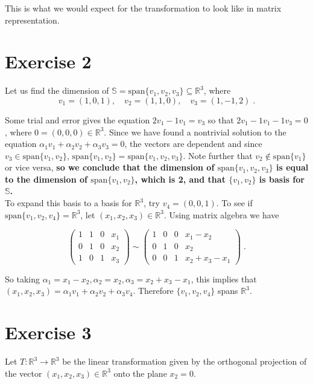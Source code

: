 \documentclass[11pt]{article}
\begin{document}
This is what we would expect for the transformation to look like in matrix representation.

\section*{Exercise 2}

Let us find the dimension of $\mathbb{S} = \text{span} \{v_1, v_2, v_3\} \subseteq \mathbb{R}^3$, where $$v_1 = (1,0,1), \quad v_2 = (1,1,0), \quad v_3 = (1,-1,2) \;.$$

Some trial and error gives the equation $2v_1 - 1v_1 = v_3$ so that $2v_1 - 1v_1 - 1v_3 = 0$, where $ 0 = (0,0,0) \in \mathbb{R}^3$. Since we have found a nontrivial solution to the equation $\alpha_1v_1 + \alpha_2v_2 + \alpha_3v_3 = 0$, the vectors are dependent and since $v_3 \in \text{span}\{v_1,v_2\}$, $\text{span}\{v_1,v_2\} = \text{span}\{v_1,v_2,v_3\}$. Note further that $v_2 \notin \text{span}\{v_1\}$ or vice versa, \textbf{so we conclude that the dimension of $\text{span}\{v_1,v_2,v_3\}$ is equal to the dimension of $\text{span}\{v_1,v_2\}$, which is 2, and that $\{v_1,v_2\}$ is basis for $\mathbb{S}$.} \\

To expand this basis to a basis for $\mathbb{R}^3$, try $v_4 = (0,0,1)$. To see if $\text{span}\{v_1,v_2,v_4\} = \mathbb{R}^3$, let $(x_1,x_2,x_3) \in \mathbb{R}^3$. Using matrix algebra we have

$$\begin{pmatrix}
1&1&0&x_1 \\ 0&1&0&x_2 \\ 1&0&1&x_3
\end{pmatrix} \sim \begin{pmatrix}
1&0&0&x_1-x_2 \\ 0&1&0&x_2 \\ 0&0&1&x_2 + x_3 - x_1
\end{pmatrix} \;.$$

So taking $\alpha_1 = x_1-x_2, \alpha_2 = x_2, \alpha_3 = x_2+x_3-x_1$, this implies that $(x_1,x_2,x_3) = \alpha_1v_1 + \alpha_2v_2 + \alpha_3v_4$. Therefore $\{v_1,v_2,v_4\}$ spans $\mathbb{R}^3$. 

\section*{Exercise 3}

Let $T: \mathbb{R}^3 \rightarrow \mathbb{R}^3$ be the linear transformation given by the orthogonal projection of the vector $(x_1,x_2,x_3) \in \mathbb{R}^3$ onto the plane $x_2 =0$.\\
\end{document}
